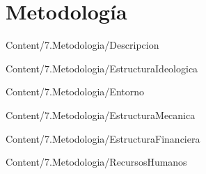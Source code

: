 
\section{Metodología}

{Content/7.Metodologia/Descripcion}

{Content/7.Metodologia/EstructuraIdeologica}

{Content/7.Metodologia/Entorno}

{Content/7.Metodologia/EstructuraMecanica}

{Content/7.Metodologia/EstructuraFinanciera}

{Content/7.Metodologia/RecursosHumanos}
